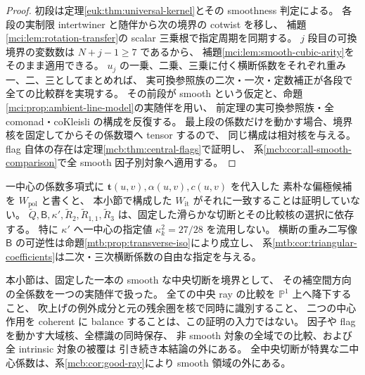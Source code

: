 \begin{proof}
初段は定理\ref{euk:thm:universal-kernel}とその smoothness 判定による。
各段の実制限 intertwiner と随伴から次の境界の cotwist を移し、
補題\ref{mci:lem:rotation-transfer}の scalar 三乗根で指定周期を同期する。
$j$ 段目の可換境界の変数数は $N+j-1\ge7$ であるから、
補題\ref{mci:lem:smooth-cubic-arity}をそのまま適用できる。
$u_j$ の一乗、二乗、三乗に付く横断係数をそれぞれ重み一、二、三としてまとめれば、
実可換参照族の二次・一次・定数補正が各段で全ての比較群を実現する。
その前段が smooth という仮定と、命題\ref{mci:prop:ambient-line-model}の実随伴を用い、
前定理の実可換参照族・全 comonad・coKleisli の構成を反復する。
最上段の係数だけを動かす場合、境界核を固定してからその係数環へ tensor するので、
同じ構成は相対核を与える。
flag 自体の存在は定理\ref{mcb:thm:central-flags}で証明し、
系\ref{mcb:cor:all-smooth-comparison}で全 smooth 因子別対象へ適用する。
\end{proof}

\begin{remark}
\label{mci:rem:scope}
一中心の係数多項式に $\mathbf t(u,v),\alpha(u,v),c(u,v)$ を代入した
素朴な偏極候補を $W_{\mathrm{pol}}$ と書くと、
本小節で構成した $W_{\mathrm{it}}$ がそれに一致することは証明していない。
$\widetilde Q,\mathsf B,\kappa',\widetilde R_2,
\widetilde R_{1,1},\widetilde R_3$ は、固定した滑らかな切断とその比較核の選択に依存する。
特に $\kappa'$ へ一中心の指定値 $\kappa_k^2=27/28$ を流用しない。
横断の重み二写像 $\mathsf B$ の可逆性は命題\ref{mtb:prop:transverse-iso}により成立し、
系\ref{mtb:cor:triangular-coefficients}は二次・三次横断係数の自由な指定を与える。

本小節は、固定した一本の smooth な中央切断を境界として、
その補空間方向の全係数を一つの実随伴で扱った。
全ての中央 ray の比較を $\mathbb P^1$ 上へ降下すること、
吹上げの例外成分と元の残余圏を核で同時に識別すること、
二つの中心作用を coherent に balance することは、この証明の入力ではない。
因子や flag を動かす大域核、全標識の同時保存、
非 smooth 対象の全域での比較、および全 intrinsic 対象の被覆は
引き続き本結論の外にある。
全中央切断が特異な二中心係数は、系\ref{mcb:cor:good-ray}により smooth 領域の外にある。
\end{remark}
